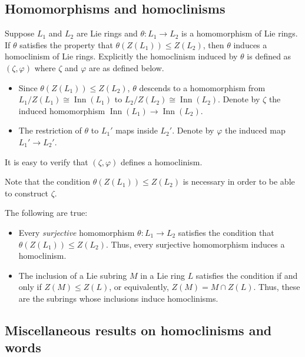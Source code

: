 \documentclass{ucetd}
\begin{document}
\subsection{Homomorphisms and homoclinisms}

Suppose $L_1$ and $L_2$ are Lie rings and $\theta: L_1 \to L_2$ is a
homomorphism of Lie rings. If $\theta$ satisfies the property that
$\theta(Z(L_1)) \le Z(L_2)$, then $\theta$ induces a homoclinism of
Lie rings. Explicitly the homoclinism induced by $\theta$ is defined as
$(\zeta,\varphi)$ where $\zeta$ and $\varphi$ are as defined below.

\begin{itemize}
\item Since $\theta(Z(L_1)) \le Z(L_2)$, $\theta$ descends to a
  homomorphism from $L_1/Z(L_1) \cong \operatorname{Inn}(L_1)$ to
  $L_2/Z(L_2) \cong \operatorname{Inn}(L_2)$. Denote by $\zeta$ the
  induced homomorphism $\operatorname{Inn}(L_1) \to
  \operatorname{Inn}(L_2)$.
\item The restriction of $\theta$ to $L_1'$ maps inside $L_2'$. Denote
  by $\varphi$ the induced map $L_1' \to L_2'$.
\end{itemize}

It is easy to verify that $(\zeta,\varphi)$ defines a homoclinism.

Note that the condition $\theta(Z(L_1)) \le Z(L_2)$ is necessary in
order to be able to construct $\zeta$.

The following are true:

\begin{itemize}
\item Every {\em surjective} homomorphism $\theta:L_1 \to L_2$
  satisfies the condition that $\theta(Z(L_1)) \le Z(L_2)$. Thus,
  every surjective homomorphism induces a homoclinism.
\item The inclusion of a Lie subring $M$ in a Lie ring $L$ satisfies
  the condition if and only if $Z(M) \le Z(L)$, or equivalently, $Z(M)
  = M \cap Z(L)$. Thus, these are the subrings whose inclusions
  induce homoclinisms.
\end{itemize}

\subsection{Miscellaneous results on homoclinisms and words}\label{sec:homoclinism-misc-results-lie}
\end{document}
